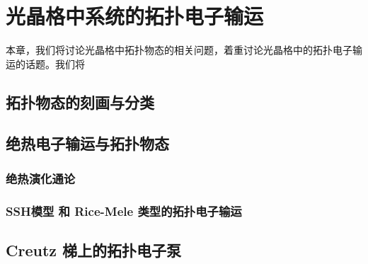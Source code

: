 \chapter{光晶格中系统的拓扑电子输运}

本章，我们将讨论光晶格中拓扑物态的相关问题，着重讨论光晶格中的拓扑电子输运的话题。我们将


\section{拓扑物态的刻画与分类}






\section{绝热电子输运与拓扑物态}\label{sec:topocp}

\subsection{绝热演化通论}\label{sec:adiabatic}



\subsection{SSH模型 和 Rice-Mele 类型的拓扑电子输运}\label{sec:ssh}




\section{ Creutz 梯上的拓扑电子泵}\label{sec:creutz}

